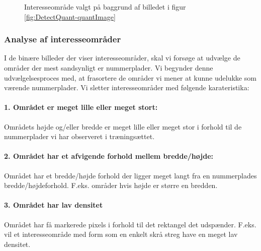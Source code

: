 \begin{figure}[htp]
  \centering
  \caption{Interesseområde valgt på baggrund af billedet i figur \vref{fig:DetectQuant-quantImage}}
  \label{fig:DetectQuant-binary}  
\end{figure}


\subsubsection{Analyse af interesseområder}
\label{sec:BinImgCleanup}
I de binære billeder der viser interesseområder, skal vi forsøge at udvælge de områder der mest sandsynligt er nummerplader. Vi begynder denne udvælgelsesproces med, at frasortere de områder vi mener at kunne udelukke som værende nummerplader. Vi sletter interesseområder med følgende karateristika:

\paragraph{1. Området er meget lille eller meget stort:}
Områdets højde og/eller bredde er meget lille eller meget stor i forhold til de nummerplader vi har observeret i træningsættet.

\paragraph{2. Området har et afvigende forhold mellem bredde/højde:}
Området har et bredde/højde forhold der ligger meget langt fra en nummerplades bredde/højdeforhold. F.eks. områder hvis højde er større en bredden. 

\paragraph{3. Området har lav densitet}
Området har få markerede pixels i forhold til det rektangel det udspænder. F.eks. vil et interesseområde med form som en enkelt skrå streg have en meget lav densitet.

